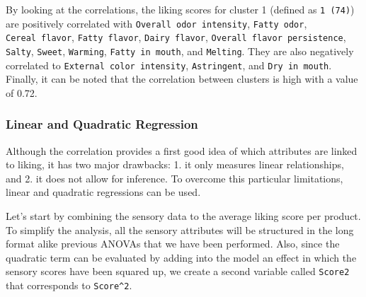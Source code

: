 \documentclass[
]{book}
\begin{document}
By looking at the correlations, the liking scores for cluster 1 (defined as \texttt{1\ (74)}) are positively correlated with \texttt{Overall\ odor\ intensity}, \texttt{Fatty\ odor}, \texttt{Cereal\ flavor}, \texttt{Fatty\ flavor}, \texttt{Dairy\ flavor}, \texttt{Overall\ flavor\ persistence}, \texttt{Salty}, \texttt{Sweet}, \texttt{Warming}, \texttt{Fatty\ in\ mouth}, and \texttt{Melting}. They are also negatively correlated to \texttt{External\ color\ intensity}, \texttt{Astringent}, and \texttt{Dry\ in\ mouth}.
Finally, it can be noted that the correlation between clusters is high with a value of 0.72.

\hypertarget{linear-and-quadratic-regression}{%
\subsubsection{Linear and Quadratic Regression}\label{linear-and-quadratic-regression}}

Although the correlation provides a first good idea of which attributes are linked to liking, it has two major drawbacks: 1. it only measures linear relationships, and 2. it does not allow for inference.
To overcome this particular limitations, linear and quadratic regressions can be used.

Let's start by combining the sensory data to the average liking score per product. To simplify the analysis, all the sensory attributes will be structured in the long format alike previous ANOVAs that we have been performed. Also, since the quadratic term can be evaluated by adding into the model an effect in which the sensory scores have been squared up, we create a second variable called \texttt{Score2} that corresponds to \texttt{Score\^{}2}.
\end{document}
